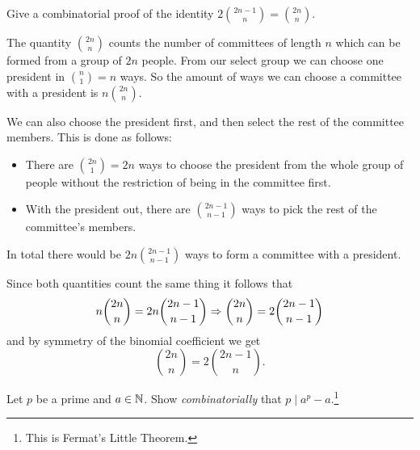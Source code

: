 \documentclass[12pt]{memoir}
\begin{document}
\begin{Ej}
    Give a combinatorial proof of the identity $2\binom{2n-1}{n}=\binom{2n}{n}$.
\end{Ej}
\begin{ptcbr}
    The quantity $\binom{2n}{n}$ counts the number of committees of length $n$ which can be formed from a group of $2n$ people. From our select group we can choose one president in $\binom{n}{1}=n$ ways. So the amount of ways we can choose a committee with a president is $n\binom{2n}{n}$.\par 
    We can also choose the president first, and then select the rest of the committee members. This is done as follows:
    \begin{itemize}
        \itemsep=-0.4em
        \item There are $\binom{2n}{1}=2n$ ways to choose the president from the whole group of people without the restriction of being in the committee first.
        \item With the president out, there are $\binom{2n-1}{n-1}$ ways to pick the rest of the committee's members.
    \end{itemize}
    In total there would be $2n\binom{2n-1}{n-1}$ ways to form a committee with a president.\par 
    Since both quantities count the same thing it follows that 
    $$n\binom{2n}{n}=2n\binom{2n-1}{n-1}\Rightarrow\binom{2n}{n}=2\binom{2n-1}{n-1}$$
    and by symmetry of the binomial coefficient we get 
    $$\binom{2n}{n}=2\binom{2n-1}{n}.$$
\end{ptcbr}

\begin{Ej}
    Let $p$ be a prime and $a\in\mathbb{N}$. Show \emph{combinatorially} that $p\mid a^p-a$.\footnote{This is Fermat's Little Theorem.}
\end{Ej}
\end{document}
